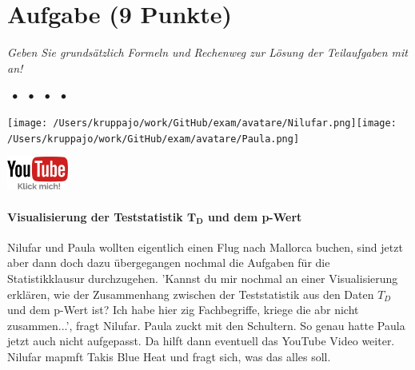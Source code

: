 \documentclass[a4paper, 9pt]{scrartcl}\usepackage[]{graphicx}\usepackage[]{xcolor}
\begin{document}
 
\clearpage

\section{Aufgabe \hfill (9 Punkte)}

\textit{Geben Sie grundsätzlich Formeln und Rechenweg zur Lösung der Teilaufgaben mit an!} \\[1Ex]


 
\ifcollection
\begin{flushright}
\tiny\vspace{-3Ex}
\textbf{\examinhaltstart}
\exammodulemathstat $\;\bullet$
\exammodulestat $\;\bullet$
\exammodulestatbbv $\;\bullet$
\exammodulestatversuch $\;\bullet$
\exammodulebiostat
\vspace{-4Ex}
\end{flushright}
\begin{minipage}[t]{0.5\textwidth}
\texttt{[image: /Users/kruppajo/work/GitHub/exam/avatare/Nilufar.png]}\hspace{-4mm}\texttt{[image: /Users/kruppajo/work/GitHub/exam/avatare/Paula.png]}
\end{minipage}
\begin{minipage}[t]{0.5\textwidth}
\hfill
\href{https://youtu.be/2LQzyQCy2FI}{\includegraphics[width = 2cm]{img/youtube}}
\end{minipage}
\fi



\ifcollection
\paragraph{Visualisierung der Teststatistik $\boldsymbol{T_D}$ und dem p-Wert}
\fi

Nilufar und Paula wollten eigentlich einen Flug nach Mallorca buchen, sind jetzt aber dann doch dazu übergegangen nochmal die Aufgaben für die Statistikklausur durchzugehen. 'Kannst du mir nochmal an einer Visualisierung erklären, wie der Zusammenhang zwischen der Teststatistik aus den Daten $T_D$ und dem p-Wert ist? Ich habe hier zig Fachbegriffe, kriege die abr nicht zusammen...', fragt Nilufar. Paula zuckt mit den Schultern. So genau hatte Paula jetzt auch nicht aufgepasst. Da hilft dann eventuell das YouTube Video weiter. Nilufar mapmft Takis Blue Heat und fragt sich, was das alles soll.
\end{document}
